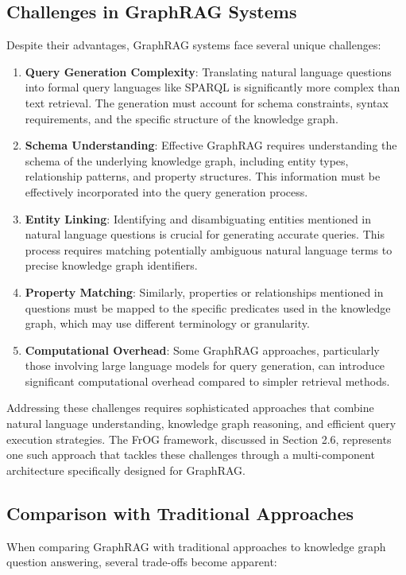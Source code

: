 \subsection{Challenges in GraphRAG Systems}
Despite their advantages, GraphRAG systems face several unique challenges:

\begin{enumerate}
    \item \textbf{Query Generation Complexity}: Translating natural language questions into formal query languages like SPARQL is significantly more complex than text retrieval. The generation must account for schema constraints, syntax requirements, and the specific structure of the knowledge graph.
    
    \item \textbf{Schema Understanding}: Effective GraphRAG requires understanding the schema of the underlying knowledge graph, including entity types, relationship patterns, and property structures. This information must be effectively incorporated into the query generation process.
    
    \item \textbf{Entity Linking}: Identifying and disambiguating entities mentioned in natural language questions is crucial for generating accurate queries. This process requires matching potentially ambiguous natural language terms to precise knowledge graph identifiers.
    
    \item \textbf{Property Matching}: Similarly, properties or relationships mentioned in questions must be mapped to the specific predicates used in the knowledge graph, which may use different terminology or granularity.
    
    \item \textbf{Computational Overhead}: Some GraphRAG approaches, particularly those involving large language models for query generation, can introduce significant computational overhead compared to simpler retrieval methods.
\end{enumerate}

Addressing these challenges requires sophisticated approaches that combine natural language understanding, knowledge graph reasoning, and efficient query execution strategies. The FrOG framework, discussed in Section 2.6, represents one such approach that tackles these challenges through a multi-component architecture specifically designed for GraphRAG.

\subsection{Comparison with Traditional Approaches}
When comparing GraphRAG with traditional approaches to knowledge graph question answering, several trade-offs become apparent:

